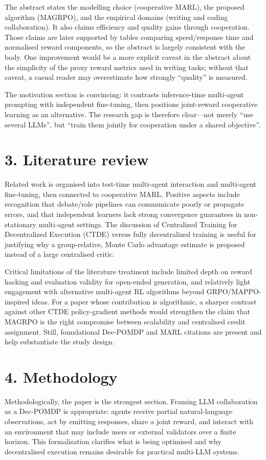 \documentclass[11pt,a4paper]{article}
\begin{document}
The abstract states the modelling choice (cooperative MARL), the proposed algorithm (MAGRPO), and the empirical domains (writing and coding collaboration). It also claims efficiency and quality gains through cooperation. Those claims are later supported by tables comparing speed/response time and normalised reward components, so the abstract is largely consistent with the body. One improvement would be a more explicit caveat in the abstract about the simplicity of the proxy reward metrics used in writing tasks; without that caveat, a casual reader may overestimate how strongly ``quality'' is measured.

The motivation section is convincing: it contrasts inference-time multi-agent prompting with independent fine-tuning, then positions joint-reward cooperative learning as an alternative. The research gap is therefore clear---not merely ``use several LLMs'', but ``train them jointly for cooperation under a shared objective''.

\section*{3. Literature review}
Related work is organised into test-time multi-agent interaction and multi-agent fine-tuning, then connected to cooperative MARL. Positive aspects include recognition that debate/role pipelines can communicate poorly or propagate errors, and that independent learners lack strong convergence guarantees in non-stationary multi-agent settings. The discussion of Centralized Training for Decentralized Execution (CTDE) versus fully decentralized training is useful for justifying why a group-relative, Monte Carlo advantage estimate is proposed instead of a large centralised critic.

Critical limitations of the literature treatment include limited depth on reward hacking and evaluation validity for open-ended generation, and relatively light engagement with alternative multi-agent RL algorithms beyond GRPO/MAPPO-inspired ideas. For a paper whose contribution is algorithmic, a sharper contrast against other CTDE policy-gradient methods would strengthen the claim that MAGRPO is the right compromise between scalability and centralised credit assignment. Still, foundational Dec-POMDP and MARL citations are present and help substantiate the study design.

\section*{4. Methodology}
Methodologically, the paper is the strongest section. Framing LLM collaboration as a Dec-POMDP is appropriate: agents receive partial natural-language observations, act by emitting responses, share a joint reward, and interact with an environment that may include users or external validators over a finite horizon. This formalisation clarifies what is being optimised and why decentralised execution remains desirable for practical multi-LLM systems.
\end{document}
